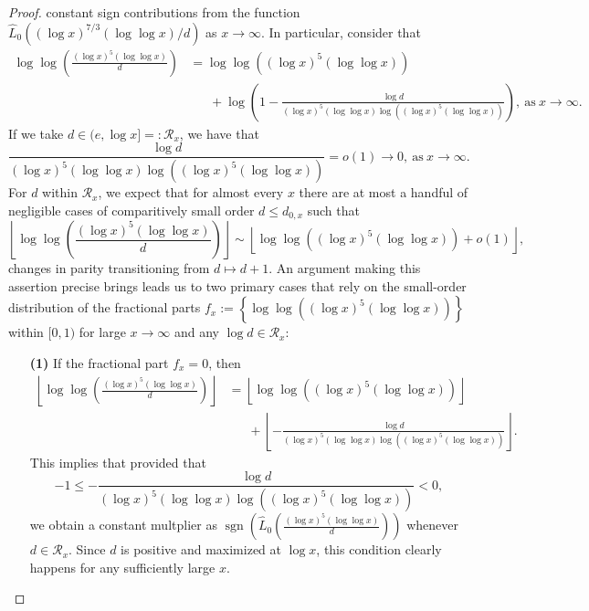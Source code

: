 \documentclass[11pt,reqno,a4letter]{article}
\numberwithin{figure}{section}
\numberwithin{table}{section}
\newcommand{\floor}[1]{\left\lfloor #1 \right\rfloor}
\theoremstyle{plain}
\numberwithin{theorem}{section}
\theoremstyle{definition}
\begin{document}
\begin{proof}
constant sign contributions from the 
function $\widehat{L}_0((\log x)^{7/3} (\log\log x) / d)$ as $x \rightarrow \infty$. 
In particular, consider that 
\begin{align*} 
\log\log\left(\frac{(\log x)^{5} (\log\log x)}{d}\right) & = 
     \log\log\left((\log x)^{5} (\log\log x)\right) \\ 
     & \phantom{=\ } + \log\left(1 - 
     \frac{\log d}{(\log x)^{5} (\log\log x) \log\left( 
     (\log x)^{5} (\log\log x)\right)}\right), 
     \mathrm{\ as\ } x \rightarrow \infty. 
\end{align*} 
If we take $d \in (e, \log x] =: \mathcal{R}_x$, we have that 
$$\frac{\log d}{(\log x)^{5} (\log\log x) \log\left( 
 (\log x)^{5} (\log\log x)\right)} = o(1) \rightarrow 0, \mathrm{\ as\ } 
 x \rightarrow \infty.$$  
For $d$ within $\mathcal{R}_x$, 
we expect that for almost every $x$ there are at most 
a handful of negligible cases of comparitively small order 
$d \leq d_{0,x}$ such that 
\[
\floor{\log\log\left(\frac{(\log x)^{5} (\log\log x)}{d}\right)} \sim 
     \floor{\log\log\left((\log x)^{5} (\log\log x)\right) + o(1)}, 
\]
changes in parity transitioning from $d \mapsto d+1$. 
An argument making this assertion precise brings leads us to 
two primary cases that rely on the small-order distribution of the fractional parts 
$f_x := \left\{\log\log\left((\log x)^{5} (\log\log x)\right)\right\}$ within $[0, 1)$ for 
large $x \rightarrow \infty$ and any $\log d \in \mathcal{R}_x$: 
\begin{itemize}[itemsep=0pt,topsep=0pt,leftmargin=0.35in] 
\item[\textbf{(1)}] If the fractional part 
     $f_x = 0$, then 
     \begin{align*} 
     \floor{\log\log\left(\frac{(\log x)^{5} (\log\log x)}{d}\right)} & = 
          \floor{\log\log\left((\log x)^{5} (\log\log x)\right)} \\ 
          & \phantom{=\ } + 
          \floor{-\frac{\log d}{(\log x)^{5} (\log\log x) \log\left( 
          (\log x)^{5} (\log\log x)\right)}}. 
     \end{align*} 
     This implies that provided that 
     \[
     -1 \leq -\frac{\log d}{(\log x)^{5} (\log\log x) \log\left( 
          (\log x)^{5} (\log\log x)\right)} < 0, 
     \]
     we obtain a constant multplier as 
     $\operatorname{sgn}\left(\widehat{L}_0\left(\frac{(\log x)^{5} (\log\log x)}{d}\right)\right)$ 
     whenever $d \in \mathcal{R}_x$. 
     Since $d$ is positive and maximized at $\log x$, 
     this condition clearly happens for any sufficiently large $x$. 

\end{itemize}
\end{proof}
\end{document}
